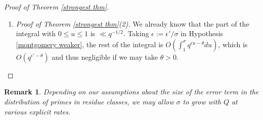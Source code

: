 \documentclass[12pt,reqno]{amsart}
\numberwithin{equation}{section}
\theoremstyle{plain}
\newtheorem{rek}[thm]{Remark}
\begin{document}
\begin{proof}[Proof of Theorem \ref{strongest thm}]
\begin{enumerate}
\item \emph{Proof of Theorem \ref{strongest thm}(2).} We already know that the part of the integral with $0\leq u\leq 1$ is $\ll q^{-1/2}$. Taking $\epsilon:=\epsilon'/\sigma$ in Hypothesis \ref{montgomery weaker}, the rest of the integral is $O\left(\int_1^{\sigma} q^{\epsilon u-\theta }du\right)$, which is $O\left(q^{\epsilon'-\theta}\right)$ and thus negligible if we may take $\theta > 0$.

\end{enumerate}
\end{proof}

\begin{rek} Depending on our assumptions about the size of the error term in the distribution of primes in residue classes, we may allow $\sigma$ to grow with $Q$ at various explicit rates.
\end{rek}
\end{document}
